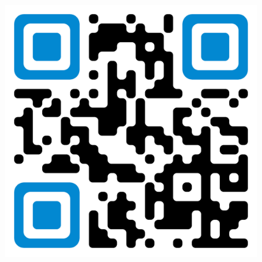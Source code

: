 \documentclass[
  letterpaper,
  DIV=11,
  numbers=noendperiod]{scrartcl}
\begin{document}
\begin{figure}
\begin{minipage}[t]{0.20\linewidth}
{{\includegraphics{../img/gemcity_discord_qr.png}

}

}

\end{minipage}%
%
\begin{minipage}[t]{0.05\linewidth}

{\centering 

~

}

\end{minipage}%
%
\begin{minipage}[t]{0.50\linewidth}

{\centering 

}
\end{minipage}
\end{figure}
\end{document}
